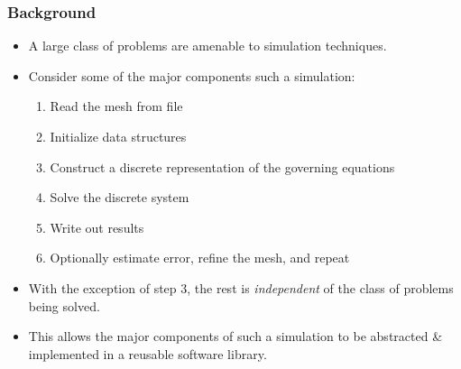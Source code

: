 \frame
{
  \frametitle{Background}
  \begin{itemize}
    \item A large class of problems are amenable to  simulation techniques.
    \item Consider some of the major components such a simulation:
      \pause
      \begin{enumerate}
        \item Read the mesh from file
        \item Initialize data structures
        \item Construct a discrete representation of the governing equations
        \item Solve the discrete system
        \item Write out results
        \item Optionally estimate error, refine the mesh, and repeat
      \end{enumerate}

    \pause
    \item With the exception of step 3, the rest is \emph{independent} of the class of problems being solved.
    \pause
    \item This allows the major components of such a simulation to be abstracted \& implemented in a reusable software library.
  \end{itemize}
}




